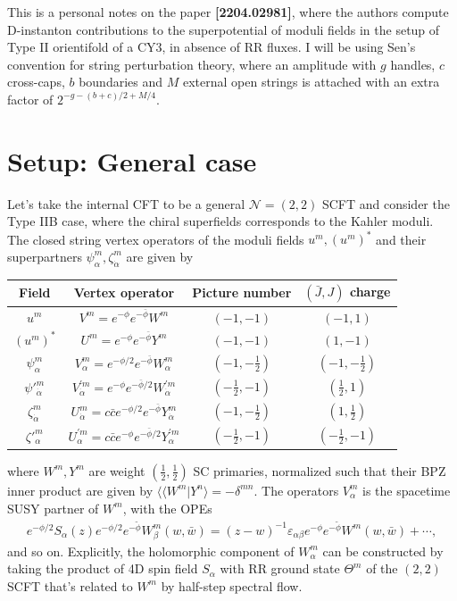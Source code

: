 \documentclass[12pt]{article}
\newcommand{\ie}{\begin{equation}\begin{aligned}}
\newcommand{\fe}{\end{aligned}\end{equation}}
\begin{document}
This is a personal notes on the paper \textbf{[2204.02981]}, where the authors compute D-instanton contributions to the superpotential of moduli fields in the setup of Type II orientifold of a CY3, in absence of RR fluxes. I will be using Sen's convention for string perturbation theory, where an amplitude with $g$ handles, $c$ cross-caps, $b$ boundaries and $M$ external open strings is attached with an extra factor of $2^{-g-(b+c)/2+M/4}$.

\section{Setup: General case}

Let's take the internal CFT to be a general $\mathcal{N}=(2,2)$ SCFT and consider the Type IIB case, where the chiral superfields corresponds to the Kahler moduli. The closed string vertex operators of the moduli fields $u^m, (u^m)^*$ and their superpartners $\psi_\alpha^m, \zeta_{\dot{\alpha}}^m$ are given by

\begin{center}
\begin{tabular}{cccc}
\hline \hline
  Field & Vertex operator & Picture number & $(\bar J,J)$ charge  \\
    \hline \hline
   $u^m$ & $V^m=e^{-\phi}e^{-\bar\phi}W^m$ & $(-1,-1)$ & $(-1,1)$ \\

 $(u^{m})^\ast $ & $U^m=e^{-\phi}e^{-\bar\phi}Y^m$ & $(-1,-1)$ & $(1,-1)$ \\

   $\psi^m_\alpha $&$V^m_\alpha=e^{-\phi/2}e^{-\bar\phi}W^{m}_\alpha$ & $(-1,-\frac{1}{2})$ & $(-1,-\frac{1}{2})$ \\

   $\psi'^m_{\dot{\alpha}} $& $V^{\prime m}_{\dot{\alpha}}=
   e^{-\phi}e^{-\bar\phi/2}W^{\prime m}_{\dot{\alpha}}$ & $(-\frac{1}{2},-1)$ & $(\frac{1}{2},1)$ \\

  $\zeta^m_{\dot{\alpha}}$&$U_{\dot{\alpha}}^{m}=c\bar c e^{-\phi/2} e^{-\bar\phi}Y^{m}_{\dot{\alpha}}$ & $(-1,-\frac{1}{2})$ & $(1,\frac{1}{2})$ \\

   $\zeta'^m_\alpha$& $U^{\prime m}_{\alpha}=c\bar c e^{-\phi} e^{-\bar\phi/2}
Y^{\prime m}_\alpha$ & $(-\frac{1}{2},-1)$ & $(-\frac{1}{2},-1)$ \\
    \hline \hline   \end{tabular}
\end{center}
where $W^m, Y^m$ are weight $(\frac{1}{2}, \frac{1}{2})$ SC primaries, normalized such that their BPZ inner product are given by $\langle \langle W^m|Y^n\rangle = -\delta^{mn}$. The operators $V_\alpha^m$ is the spacetime SUSY partner of $W^m$, with the OPEs
\ie
e^{-\phi / 2} S_\alpha(z) e^{-\phi / 2} e^{-\tilde{\phi}} W_\beta^m(w, \bar{w})=(z-w)^{-1} \varepsilon_{\alpha \beta} e^{-\phi} e^{-\tilde{\phi}} W^m(w, \bar{w})+\cdots,
\fe
and so on. Explicitly, the holomorphic component of $W_\alpha^m$ can be constructed by taking the product of 4D spin field $S_\alpha$ with RR ground state $\Theta^m$ of the $(2,2)$ SCFT that's related to $W^m$ by half-step spectral flow.
\end{document}
